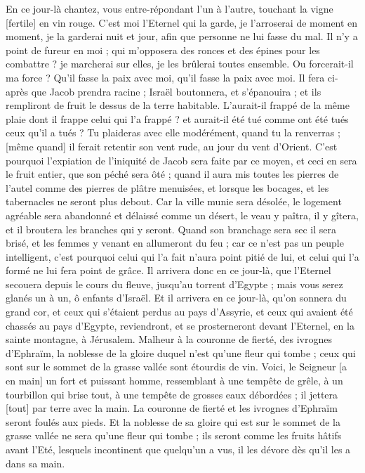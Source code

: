\begin{multicols}{2}
En ce jour-là chantez, vous entre-répondant l'un à l'autre, touchant la vigne [fertile] en vin rouge.
C'est moi l'Eternel qui la garde, je l'arroserai de moment en moment, je la garderai nuit et jour, afin que personne ne lui fasse du mal.
Il n'y a point de fureur en moi ; qui m'opposera des ronces et des épines pour les combattre ? je marcherai sur elles, je les brûlerai toutes ensemble.
Ou forcerait-il ma force ? Qu'il fasse la paix avec moi, qu'il fasse la paix avec moi.
Il fera ci-après que Jacob prendra racine ; Israël boutonnera, et s'épanouira ; et ils rempliront de fruit le dessus de la terre habitable.
L'aurait-il frappé de la même plaie dont il frappe celui qui l'a frappé ? et aurait-il été tué comme ont été tués ceux qu'il a tués ?
Tu plaideras avec elle modérément, quand tu la renverras ; [même quand] il ferait retentir son vent rude, au jour du vent d'Orient.
C'est pourquoi l'expiation de l'iniquité de Jacob sera faite par ce moyen, et ceci en sera le fruit entier, que son péché sera ôté ; quand il aura mis toutes les pierres de l'autel comme des pierres de plâtre menuisées, et lorsque les bocages, et les tabernacles ne seront plus debout.
Car la ville munie sera désolée, le logement agréable sera abandonné et délaissé comme un désert, le veau y paîtra, il y gîtera, et il broutera les branches qui y seront.
Quand son branchage sera sec il sera brisé, et les femmes y venant en allumeront du feu ; car ce n'est pas un peuple intelligent, c'est pourquoi celui qui l'a fait n'aura point pitié de lui, et celui qui l'a formé ne lui fera point de grâce.
Il arrivera donc en ce jour-là, que l'Eternel secouera depuis le cours du fleuve, jusqu'au torrent d'Egypte ; mais vous serez glanés un à un, ô enfants d'Israël.
Et il arrivera en ce jour-là, qu'on sonnera du grand cor, et ceux qui s'étaient perdus au pays d'Assyrie, et ceux qui avaient été chassés au pays d'Egypte, reviendront, et se prosterneront devant l'Eternel, en la sainte montagne, à Jérusalem.
\VerseOne{}Malheur à la couronne de fierté, des ivrognes d'Ephraïm, la noblesse de la gloire duquel n'est qu'une fleur qui tombe ; ceux qui sont sur le sommet de la grasse vallée sont étourdis de vin.
Voici, le Seigneur [a en main] un fort et puissant homme, ressemblant à une tempête de grêle, à un tourbillon qui brise tout, à une tempête de grosses eaux débordées ; il jettera [tout] par terre avec la main.
La couronne de fierté et les ivrognes d'Ephraïm seront foulés aux pieds.
Et la noblesse de sa gloire qui est sur le sommet de la grasse vallée ne sera qu'une fleur qui tombe ; ils seront comme les fruits hâtifs avant l'Eté, lesquels incontinent que quelqu'un a vus, il les dévore dès qu'il les a dans sa main.

\end{multicols}
